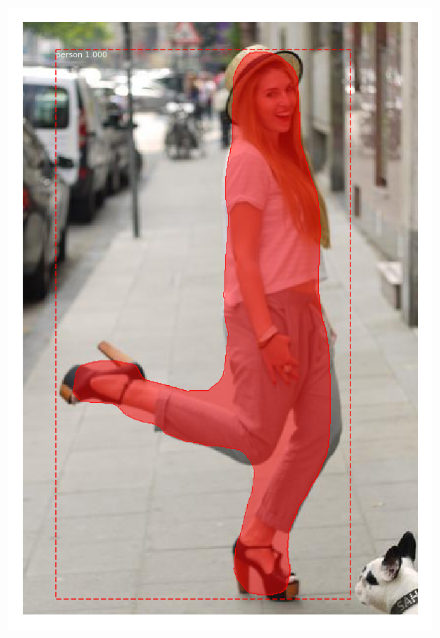 \documentclass[12pt]{report}
\begin{document}
\begin{figure}
\begin{minipage}[b]{0.3\textwidth}
    \includegraphics[width=\textwidth]{images/resultados/349322person.png}

\end{minipage}
\end{figure}
\end{document}
